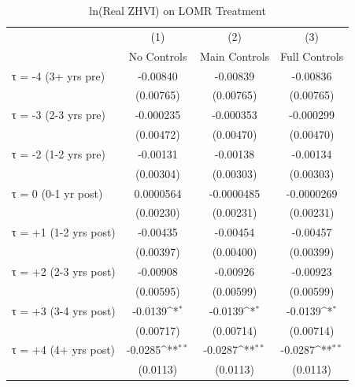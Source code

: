 \begin{table}[htbp]\centering
\def\sym#1{\ifmmode^{#1}\else\(^{#1}\)\fi}
\caption{ln(Real ZHVI) on LOMR Treatment}
\begin{tabular}{l*{3}{c}}
\hline\hline
                    &\multicolumn{1}{c}{(1)}&\multicolumn{1}{c}{(2)}&\multicolumn{1}{c}{(3)}\\
                    &\multicolumn{1}{c}{No Controls}&\multicolumn{1}{c}{Main Controls}&\multicolumn{1}{c}{Full Controls}\\
\hline
τ = -4 (3+ yrs pre) &    -0.00840         &    -0.00839         &    -0.00836         \\
                    &   (0.00765)         &   (0.00765)         &   (0.00765)         \\
[1em]
τ = -3 (2-3 yrs pre)&   -0.000235         &   -0.000353         &   -0.000299         \\
                    &   (0.00472)         &   (0.00470)         &   (0.00470)         \\
[1em]
τ = -2 (1-2 yrs pre)&    -0.00131         &    -0.00138         &    -0.00134         \\
                    &   (0.00304)         &   (0.00303)         &   (0.00303)         \\
[1em]
τ = 0 (0-1 yr post) &   0.0000564         &  -0.0000485         &  -0.0000269         \\
                    &   (0.00230)         &   (0.00231)         &   (0.00231)         \\
[1em]
τ = +1 (1-2 yrs post)&    -0.00435         &    -0.00454         &    -0.00457         \\
                    &   (0.00397)         &   (0.00400)         &   (0.00399)         \\
[1em]
τ = +2 (2-3 yrs post)&    -0.00908         &    -0.00926         &    -0.00923         \\
                    &   (0.00595)         &   (0.00599)         &   (0.00599)         \\
[1em]
τ = +3 (3-4 yrs post)&     -0.0139\sym{*}  &     -0.0139\sym{*}  &     -0.0139\sym{*}  \\
                    &   (0.00717)         &   (0.00714)         &   (0.00714)         \\
[1em]
τ = +4 (4+ yrs post)&     -0.0285\sym{**} &     -0.0287\sym{**} &     -0.0287\sym{**} \\
                    &    (0.0113)         &    (0.0113)         &    (0.0113)         \\

\end{tabular}
\end{table}

